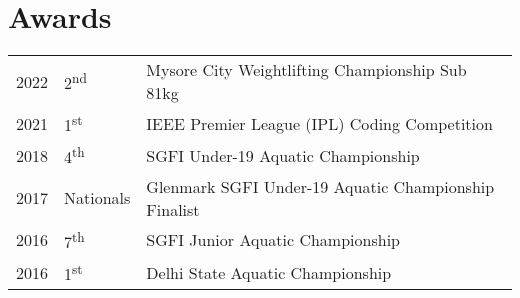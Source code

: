 \documentclass[]{deedy-resume-openfont}
\begin{document}
\begin{minipage}[t]{0.66\textwidth}
\section{Awards} 
\begin{tabular}{rll}
2022     & 2\textsuperscript{nd}& Mysore City Weightlifting Championship Sub 81kg\\
2021	     & 1\textsuperscript{st}  & IEEE Premier League (IPL) Coding Competition\\
2018	     & 4\textsuperscript{th}  & SGFI Under-19 Aquatic Championship\\
2017	     & Nationals  & Glenmark SGFI Under-19 Aquatic Championship Finalist\\
2016     & 7\textsuperscript{th} & SGFI Junior Aquatic Championship  \\
2016     & 1\textsuperscript{st} &  Delhi State Aquatic Championship\\
\end{tabular}
\sectionsep



\end{minipage} 
\end{document}
